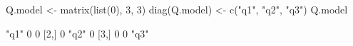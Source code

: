 \begin{Schunk}
\begin{Sinput}
 Q.model <- matrix(list(0), 3, 3)
 diag(Q.model) <- c("q1", "q2", "q3")
 Q.model
\end{Sinput}
\begin{Soutput}
     [,1] [,2] [,3]
[1,] "q1" 0    0   
[2,] 0    "q2" 0   
[3,] 0    0    "q3"
\end{Soutput}
\end{Schunk}
